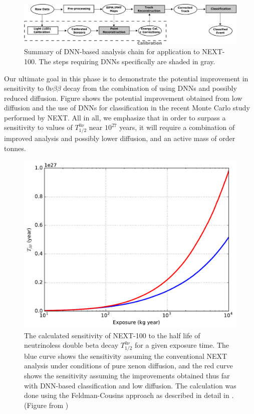 \documentclass[11pt,a4paper]{article}
\begin{document}
\begin{figure}[!htb]
	\centering
	\includegraphics[scale=0.18]{fig/analysis_diagram.pdf}
	\caption{\label{fig.analysis}Summary of DNN-based analysis chain for application to NEXT-100. The steps requiring DNNs specifically are shaded in gray.}
\end{figure}

Our ultimate goal in this phase is to demonstrate the potential improvement in sensitivity to $0\nu\beta\beta$ decay from the combination of using DNNs and possibly reduced diffusion. Figure shows the potential improvement obtained from low diffusion and the use of DNNs for classification in the recent Monte Carlo study \cite{NEXT_DNN} performed by NEXT. All in all, we emphasize that in order to surpass a sensitivity to values of $T^{0\nu}_{1/2}$ near $10^{27}$ years, it will require a combination of improved analysis and possibly lower diffusion, and an active mass of order tonnes.\\

\begin{figure}[!htb]
	\centering
	\includegraphics[scale=0.6]{fig/half_life_sensitivity.pdf}
	\caption{\label{fig.halflife}The calculated sensitivity of NEXT-100 to the half life of neutrinoless double beta decay $T^{0\nu}_{1/2}$ for a given exposure time. The blue curve shows the sensitivity assuming the conventional NEXT analysis under conditions of pure xenon diffusion, and the red curve shows the sensitivity assuming the improvements obtained thus far with DNN-based classification and low diffusion. The calculation was done using the Feldman-Cousins approach \cite{Feldman_1998} as described in detail in \cite{NEXT_sensitivity}. (Figure from \cite{NEXT_DNN})}
\end{figure}
\end{document}
